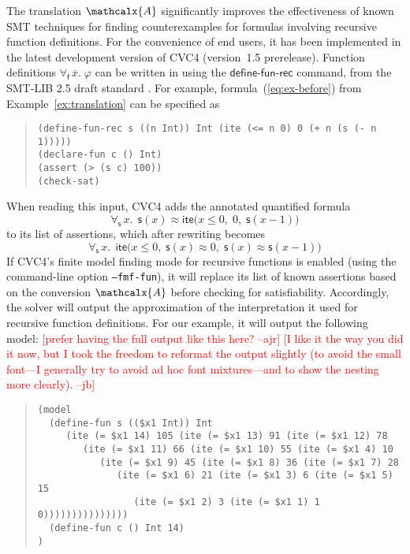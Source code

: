 \documentclass[runningheads,a4paper]{llncs}
\newcommand{\con}[1]{\mathsf{#1}}
\renewcommand\vec[1]{\overline{#1}}
\newcommand\cvc{CVC4\xspace}
\newcommand{\teq}{\approx}
\newcommand{\conv}{\mathcalx{A}}
\newcommand{\lite}{\con{ite}}
\newcommand{\forallf}[1]{\forall_{\!#1\:}}
\newcommand{\rem}[1]{\textcolor{red}{[#1]}}
\newcommand{\ajr}[1]{\rem{#1 --ajr}}
\newcommand{\jb}[1]{\rem{#1 --jb}}
\newcommand{\definefunreccmd}{\con{define}\text{-}\con{fun}\text{-}\con{rec}}
\begin{document}
The translation $\conv$ significantly improves the effectiveness of known SMT
techniques for finding counterexamples for formulas involving recursive
function definitions.
For the convenience of end users, it
has been implemented in the latest development version of \cvc %
(version~1.5 prerelease).
Function definitions $\forallf{\con{f}} \vec x.\; \varphi$ can be written in using the $\definefunreccmd$ command,
from the SMT-LIB 2.5 draft standard \cite{smtlib25}.
For example, formula~(\ref{eq:ex-before}) from Example~\ref{ex:translation}
can be specified as
%
\begin{quote}
\begin{verbatim}
(define-fun-rec s ((n Int)) Int (ite (<= n 0) 0 (+ n (s (- n 1)))))
(declare-fun c () Int)
(assert (> (s c) 100))
(check-sat)
\end{verbatim}
\end{quote}
%
When reading this input,
\cvc adds the annotated quantified formula
$$\forallf{\con{s}} x.\;\, \con{s}( x ) \teq \lite\bigl( x \leq 0,\; 0,\; \con{s}( x-1 )\bigr)$$
to its list of assertions,
which after rewriting becomes
$$\forallf{\con{s}} x.\;\, \lite\bigl( x \leq 0,\; \con{s}( x ) \teq 0,\; \con{s}( x ) \teq \con{s}( x-1 ) \bigr)$$
If \cvc's finite model finding mode for recursive functions is enabled (using
the command-line option \texttt{--fmf-fun}), it will replace its list of known
assertions based on the conversion $\conv$ before checking for satisfiability.
Accordingly, the solver will output the approximation of the interpretation it
used for recursive function definitions. For our example, it will output the following
model:
\ajr{prefer having the full output like this here?}
\jb{I like it the way you did it now, but I took the freedom to reformat the output slightly
(to avoid the small font---I generally try to avoid ad hoc font mixtures---and to show
the nesting more clearly).}
%
\begin{quote}
\begin{verbatim}
(model
  (define-fun s (($x1 Int)) Int 
     (ite (= $x1 14) 105 (ite (= $x1 13) 91 (ite (= $x1 12) 78 
        (ite (= $x1 11) 66 (ite (= $x1 10) 55 (ite (= $x1 4) 10 
           (ite (= $x1 9) 45 (ite (= $x1 8) 36 (ite (= $x1 7) 28 
              (ite (= $x1 6) 21 (ite (= $x1 3) 6 (ite (= $x1 5) 15 
                 (ite (= $x1 2) 3 (ite (= $x1 1) 1 0)))))))))))))))
  (define-fun c () Int 14)
)
\end{verbatim}
\end{quote}
\end{document}
